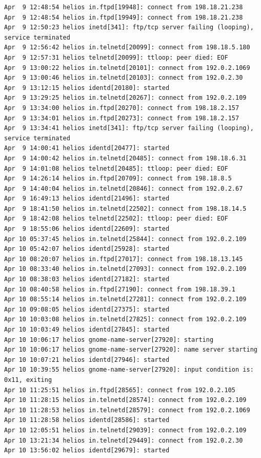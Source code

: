 \begin{lstlisting}[style=terminal]
Apr  9 12:48:54 helios in.ftpd[19948]: connect from 198.18.21.238
Apr  9 12:48:54 helios in.ftpd[19949]: connect from 198.18.21.238
Apr  9 12:50:23 helios inetd[341]: ftp/tcp server failing (looping), service terminated
Apr  9 12:56:42 helios in.telnetd[20099]: connect from 198.18.5.180
Apr  9 12:57:31 helios telnetd[20099]: ttloop: peer died: EOF
Apr  9 13:00:22 helios in.telnetd[20101]: connect from 192.0.2.1069
Apr  9 13:00:46 helios in.telnetd[20103]: connect from 192.0.2.30
Apr  9 13:12:15 helios identd[20180]: started
Apr  9 13:29:25 helios in.telnetd[20267]: connect from 192.0.2.109
Apr  9 13:34:00 helios in.ftpd[20270]: connect from 198.18.2.157
Apr  9 13:34:01 helios in.ftpd[20273]: connect from 198.18.2.157
Apr  9 13:34:41 helios inetd[341]: ftp/tcp server failing (looping), service terminated
Apr  9 14:00:41 helios identd[20477]: started
Apr  9 14:00:42 helios in.telnetd[20485]: connect from 198.18.6.31
Apr  9 14:01:08 helios telnetd[20485]: ttloop: peer died: EOF
Apr  9 14:26:14 helios in.ftpd[20709]: connect from 198.18.8.5
Apr  9 14:40:04 helios in.telnetd[20846]: connect from 192.0.2.67
Apr  9 16:49:13 helios identd[21496]: started
Apr  9 18:41:50 helios in.telnetd[22502]: connect from 198.18.14.5
Apr  9 18:42:08 helios telnetd[22502]: ttloop: peer died: EOF
Apr  9 18:55:06 helios identd[22609]: started
Apr 10 05:37:45 helios in.telnetd[25844]: connect from 192.0.2.109
Apr 10 05:42:07 helios identd[25928]: started
Apr 10 08:20:07 helios in.ftpd[27017]: connect from 198.18.13.145
Apr 10 08:33:40 helios in.telnetd[27093]: connect from 192.0.2.109
Apr 10 08:38:03 helios identd[27182]: started
Apr 10 08:40:58 helios in.ftpd[27190]: connect from 198.18.39.1
Apr 10 08:55:14 helios in.telnetd[27281]: connect from 192.0.2.109
Apr 10 09:08:05 helios identd[27375]: started
Apr 10 10:03:08 helios in.telnetd[27825]: connect from 192.0.2.109
Apr 10 10:03:49 helios identd[27845]: started
Apr 10 10:06:17 helios gnome-name-server[27920]: starting
Apr 10 10:06:17 helios gnome-name-server[27920]: name server starting
Apr 10 10:07:21 helios identd[27946]: started
Apr 10 10:39:55 helios gnome-name-server[27920]: input condition is: 0x11, exiting
Apr 10 11:25:51 helios in.ftpd[28565]: connect from 192.0.2.105
Apr 10 11:28:15 helios in.telnetd[28574]: connect from 192.0.2.109
Apr 10 11:28:53 helios in.telnetd[28579]: connect from 192.0.2.1069
Apr 10 11:28:58 helios identd[28586]: started
Apr 10 12:05:51 helios in.telnetd[29039]: connect from 192.0.2.109
Apr 10 13:21:34 helios in.telnetd[29449]: connect from 192.0.2.30
Apr 10 13:56:02 helios identd[29679]: started

\end{lstlisting}
